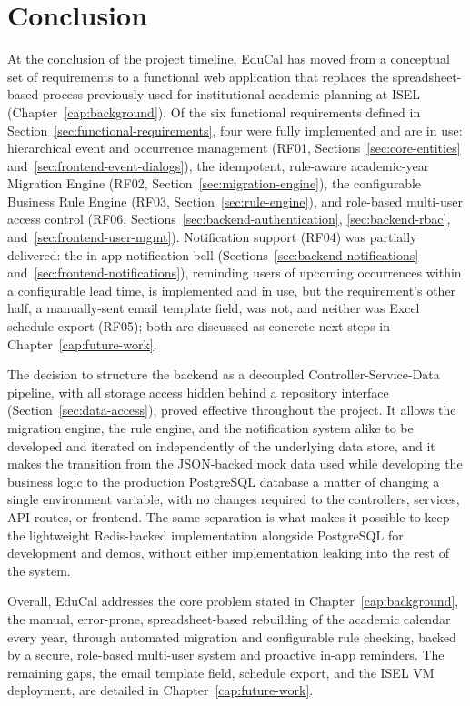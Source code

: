 %
%
\chapter{Conclusion} \label{cap:conclusion}

At the conclusion of the project timeline, EduCal has moved from a conceptual set of requirements to a functional web application that replaces the spreadsheet-based process previously used for institutional academic planning at ISEL (Chapter~\ref{cap:background}). Of the six functional requirements defined in Section~\ref{sec:functional-requirements}, four were fully implemented and are in use: hierarchical event and occurrence management (RF01, Sections~\ref{sec:core-entities} and~\ref{sec:frontend-event-dialogs}), the idempotent, rule-aware academic-year Migration Engine (RF02, Section~\ref{sec:migration-engine}), the configurable Business Rule Engine (RF03, Section~\ref{sec:rule-engine}), and role-based multi-user access control (RF06, Sections~\ref{sec:backend-authentication}, \ref{sec:backend-rbac}, and~\ref{sec:frontend-user-mgmt}). Notification support (RF04) was partially delivered: the in-app notification bell (Sections~\ref{sec:backend-notifications} and~\ref{sec:frontend-notifications}), reminding users of upcoming occurrences within a configurable lead time, is implemented and in use, but the requirement's other half, a manually-sent email template field, was not, and neither was Excel schedule export (RF05); both are discussed as concrete next steps in Chapter~\ref{cap:future-work}.

The decision to structure the backend as a decoupled Controller-Service-Data pipeline, with all storage access hidden behind a repository interface (Section~\ref{sec:data-access}), proved effective throughout the project. It allows the migration engine, the rule engine, and the notification system alike to be developed and iterated on independently of the underlying data store, and it makes the transition from the JSON-backed mock data used while developing the business logic to the production PostgreSQL database a matter of changing a single environment variable, with no changes required to the controllers, services, API routes, or frontend. The same separation is what makes it possible to keep the lightweight Redis-backed implementation alongside PostgreSQL for development and demos, without either implementation leaking into the rest of the system.

Overall, EduCal addresses the core problem stated in Chapter~\ref{cap:background}, the manual, error-prone, spreadsheet-based rebuilding of the academic calendar every year, through automated migration and configurable rule checking, backed by a secure, role-based multi-user system and proactive in-app reminders. The remaining gaps, the email template field, schedule export, and the ISEL VM deployment, are detailed in Chapter~\ref{cap:future-work}.
